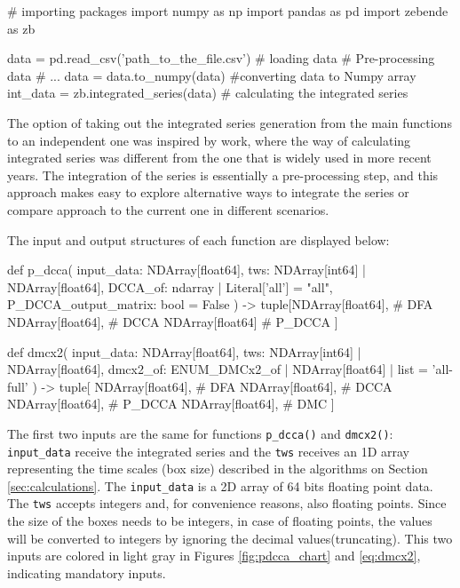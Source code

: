 \documentclass[article]{jss}
\begin{document}
\begin{Code}
# importing packages
import numpy as np
import pandas as pd
import zebende as zb

data = pd.read_csv('path_to_the_file.csv') # loading data
# Pre-processing data
# ...
data = data.to_numpy(data) #converting data to Numpy array
int_data = zb.integrated_series(data) # calculating the integrated series
\end{Code}

The option of taking out the integrated series generation from the main functions to an independent one was inspired by \cite{Peng_1994} work, where the way of calculating integrated series was different from the one that is widely used in more recent years. The integration of the series is essentially a pre-processing step, and this approach makes easy to explore alternative ways to integrate the series or compare \cite{Peng_1994} approach to the current one in different scenarios.

The input and output structures of each function are displayed below:

\begin{Code}
def p_dcca(
    input_data: NDArray[float64],
    tws: NDArray[int64] | NDArray[float64],
    DCCA_of: ndarray | Literal['all'] = "all",
    P_DCCA_output_matrix: bool = False
) -> tuple[NDArray[float64],  # DFA
          NDArray[float64],   # DCCA
          NDArray[float64]    # P_DCCA
          ]
\end{Code}

\begin{Code}
def dmcx2(
    input_data: NDArray[float64],
    tws: NDArray[int64] | NDArray[float64],
    dmcx2_of: ENUM_DMCx2_of | NDArray[float64] | list = 'all-full'
) -> tuple[ NDArray[float64],   # DFA
            NDArray[float64],   # DCCA
            NDArray[float64],   # P_DCCA
            NDArray[float64],   # DMC
          ]
  \end{Code}

The first two inputs are the same for functions \verb"p_dcca()" and \verb"dmcx2()": \verb"input_data" receive the integrated series and the \verb"tws" receives an 1D array representing the time scales (box size) described in the algorithms on Section \ref{sec:calculations}. The \verb"input_data" is a 2D array of 64 bits floating point data. The \verb"tws" accepts integers and, for convenience reasons, also floating points. Since the size of the boxes needs to be integers, in case of floating points, the values will be converted to integers by ignoring the decimal values(truncating). This two inputs are colored in light gray in Figures \ref{fig:pdcca_chart} and \ref{eq:dmcx2}, indicating mandatory inputs.
\end{document}
